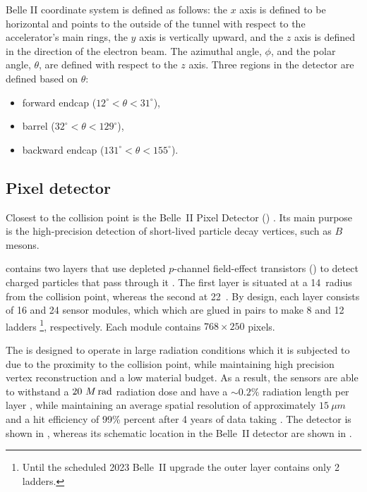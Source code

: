 Belle II coordinate system is defined as follows: the $x$ axis is defined to be horizontal and points to the outside of the tunnel with respect to the accelerator's
main rings, the $y$ axis is vertically upward, and the $z$ axis is defined in the direction of the electron beam. 
The azimuthal angle, $\phi$, and the polar angle, $\theta$, are defined with respect to the $z$ axis. 
Three regions in the detector are defined based on $\theta$: 
\begin{itemize}
    \item forward endcap (\mbox{$12^{\circ}<\theta<31^{\circ}$}), 
    \item barrel (\mbox{$32^{\circ}<\theta<129^{\circ}$}),
    \item backward endcap (\mbox{$131^{\circ}<\theta<155^{\circ}$}).
\end{itemize}


\subsection{Pixel detector}\label{sec:pxd}

Closest to the collision point is the Belle~II Pixel Detector (\PXD) \cite{Belle-II:2010dht}.
Its main purpose is the high-precision detection of short-lived particle decay vertices, such as $B$ mesons.

\PXD contains two layers that use depleted $p$-channel field-effect transistors (\DEPFET) to detect charged particles that pass through it \cite{Kemmer:1986vh}.
The first layer is situated at a 14~\mm radius from the collision point, whereas the second at 22~\mm.
By design, each layer consists of 16 and 24 sensor modules, which which are glued in pairs to make 8 and 12 ladders
\footnote[1]{Until the scheduled 2023 Belle~II upgrade the outer layer contains only 2 ladders.}, respectively.
Each module contains $768\times250$ \DEPFET pixels.

The \PXD is designed to operate in large radiation conditions which it is subjected to due to the proximity to the collision point,
while maintaining high precision vertex reconstruction and a low material budget.
As a result, the sensors are able to withstand a $20~M\rm \,rad$ 
radiation dose and have a $\sim 0.2\%$ radiation length per layer \cite{Belle-II:2010dht},
while maintaining an average spatial resolution of approximately $15~\mu m$ and a hit efficiency of 99\% percent after 4 years of data taking \cite{Belle-IIDEPFET:2022wis} .
The detector is shown in , whereas its schematic location in the Belle~II detector are shown in .

